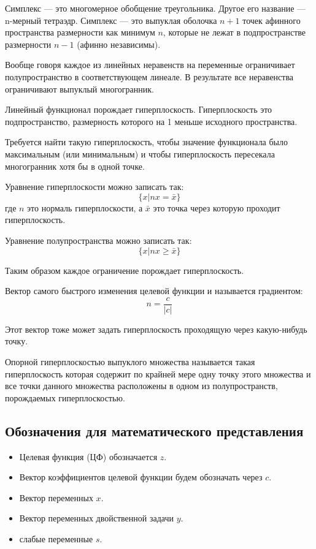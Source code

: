 \documentclass[a4paper,article,14pt]{extarticle}
\begin{document}
Симплекс --- это многомерное обобщение треугольника.
Другое его название --- n-мерный тетраэдр.
Симплекс --- это выпуклая оболочка \(n+1\) точек афинного пространства размерности как минимум \(n\), которые не лежат в подпространстве размерности \(n-1\) (афинно независимы).

Вообще говоря каждое из линейных неравенств на переменные ограничивает полупространство в соответствующем линеале.
В результате все неравенства ограничивают выпуклый многогранник.

Линейный функционал порождает гиперплоскость.
Гиперплоскость это подпространство, размерность которого на 1 меньше исходного пространства.

Требуется найти такую гиперплоскость, чтобы значение функционала было максимальным (или минимальным) и чтобы гиперплоскость пересекала многогранник хотя бы в одной точке.

Уравнение гиперплоскости можно записать так:
\begin{equation}
    \{x | nx = \bar x\}
\end{equation}
где \(n\) это нормаль гиперплоскости, а \(\bar x\) это точка через которую проходит гиперплоскость.

Уравнение полупространства можно записать так:
\begin{equation}
    \{x | nx \ge \bar x\}
\end{equation}

Таким образом каждое ограничение порождает гиперплоскость.

Вектор самого быстрого изменения целевой функции и называется градиентом:
\begin{equation}
n = \frac c {|c|}
\end{equation}

Этот вектор тоже может задать гиперплоскость проходящую через какую-нибудь точку.

Опорной гиперплоскостью выпуклого множества называется такая гиперплоскость которая содержит по крайней мере одну точку этого множества и все точки данного множества расположены в одном из полупространств, порождаемых гиперплоскостью.

\subsection{Обозначения для математического представления}

\begin{itemize}
    \item Целевая функция (ЦФ) обозначается \(z\).
    \item Вектор коэффициентов целевой функции будем обозначать через \(c\).
    \item Вектор переменных \(x\).
    \item Вектор переменных двойственной задачи \(y\).
    \item слабые переменные \(s\).
\end{itemize}
\end{document}
